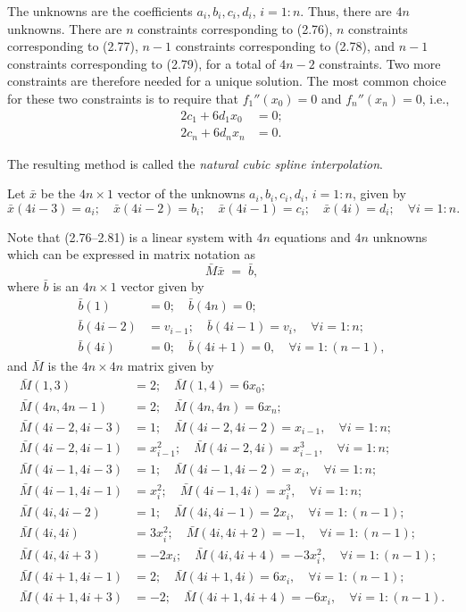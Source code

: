 
The unknowns are the coefficients $a_i,b_i,c_i,d_i$, $i=1:n$. Thus, there are $4n$
unknowns. There are $n$ constraints corresponding to (2.76), $n$ constraints
corresponding to (2.77), $n-1$ constraints corresponding to (2.78), and $n-1$
constraints corresponding to (2.79), for a total of $4n-2$ constraints. Two more
constraints are therefore needed for a unique solution. The most common choice for
these two constraints is to require that $f_1''(x_0)=0$ and $f_n''(x_n)=0$, i.e.,
\begin{align}
2c_1+6d_1x_0 &= 0; \\
2c_n+6d_nx_n &= 0.
\end{align}

The resulting method is called the \textit{natural cubic spline interpolation}.

Let $\bar x$ be the $4n\times1$ vector of the unknowns $a_i,b_i,c_i,d_i$, $i=1:n$,
given by
\[
\bar x(4i-3)=a_i; \quad \bar x(4i-2)=b_i; \quad \bar x(4i-1)=c_i; \quad
\bar x(4i)=d_i; \quad \forall i=1:n.
\]

Note that (2.76--2.81) is a linear system with $4n$ equations and $4n$ unknowns
which can be expressed in matrix notation as
\begin{equation}
\bar M\bar x \;=\; \bar b,
\end{equation}
where $\bar b$ is an $4n\times1$ vector given by
\begin{align}
\bar b(1)&=0; \quad \bar b(4n)=0; \\
\bar b(4i-2)&=v_{i-1}; \quad \bar b(4i-1)=v_i, \quad \forall i=1:n; \\
\bar b(4i)&=0; \quad \bar b(4i+1)=0, \quad \forall i=1:(n-1),
\end{align}
and $\bar M$ is the $4n\times4n$ matrix given by
\begin{align}
\bar M(1,3)&=2; \quad \bar M(1,4)=6x_0; \\
\bar M(4n,4n-1)&=2; \quad \bar M(4n,4n)=6x_n; \\
\bar M(4i-2,4i-3)&=1; \quad \bar M(4i-2,4i-2)=x_{i-1}, \quad \forall i=1:n; \\
\bar M(4i-2,4i-1)&=x_{i-1}^2; \quad \bar M(4i-2,4i)=x_{i-1}^3, \quad \forall i=1:n; \\
\bar M(4i-1,4i-3)&=1; \quad \bar M(4i-1,4i-2)=x_i, \quad \forall i=1:n; \\
\bar M(4i-1,4i-1)&=x_i^2; \quad \bar M(4i-1,4i)=x_i^3, \quad \forall i=1:n; \\
\bar M(4i,4i-2)&=1; \quad \bar M(4i,4i-1)=2x_i, \quad \forall i=1:(n-1); \\
\bar M(4i,4i)&=3x_i^2; \quad \bar M(4i,4i+2)=-1, \quad \forall i=1:(n-1); \\
\bar M(4i,4i+3)&=-2x_i; \quad \bar M(4i,4i+4)=-3x_i^2, \quad \forall i=1:(n-1); \\
\bar M(4i+1,4i-1)&=2; \quad \bar M(4i+1,4i)=6x_i, \quad \forall i=1:(n-1); \\
\bar M(4i+1,4i+3)&=-2; \quad \bar M(4i+1,4i+4)=-6x_i, \quad \forall i=1:(n-1).
\end{align}

